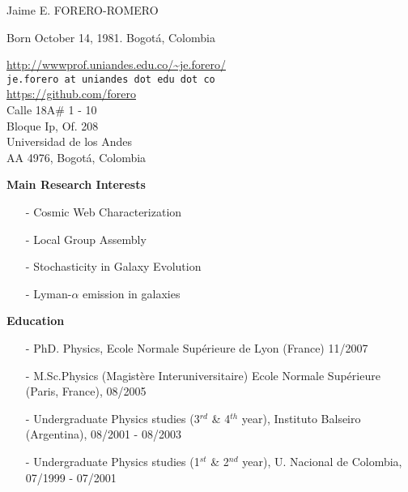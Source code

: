 \documentclass[letterpaper,11pt,onecolumn]{article}
\begin{document}
\noindent

\noindent
{{\Large Jaime E. FORERO-ROMERO}}\\
\begin{flushleft}
Born October 14, 1981. Bogot\'a, Colombia\\
\end{flushleft}
\begin{flushright}
\url{http://wwwprof.uniandes.edu.co/~je.forero/} \\{\tt{je.forero at uniandes dot edu dot co}}\\
\url{https://github.com/forero}\\
Calle 18A\# 1 - 10\\
Bloque Ip, Of. 208\\
Universidad de los Andes\\
AA 4976, Bogot\'a, Colombia\\
\end{flushright}


{\bf Main Research Interests}
\begin{itemize}
\item[-]{Cosmic Web Characterization}
\item[-]{Local Group Assembly}
\item[-]{Stochasticity in Galaxy Evolution}
\item[-]{Lyman-$\alpha$ emission in galaxies}
\end{itemize}

{\bf Education}
\indent
\begin{itemize}
\item[-] PhD. Physics, Ecole Normale Sup\'erieure de Lyon (France) 11/2007
\item[-] M.Sc.Physics (Magist\`ere Interuniversitaire)  Ecole Normale
  Sup\'erieure (Paris, France), 08/2005
\item[-] Undergraduate Physics studies (3$^{rd}$ \& 4$^{th}$ year),
  Instituto Balseiro (Argentina), 08/2001 - 08/2003
\item[-] Undergraduate Physics studies (1$^{st}$ \& 2$^{nd}$ year),
  U. Nacional de Colombia, 07/1999 -  07/2001
\end{itemize}
\end{document}
